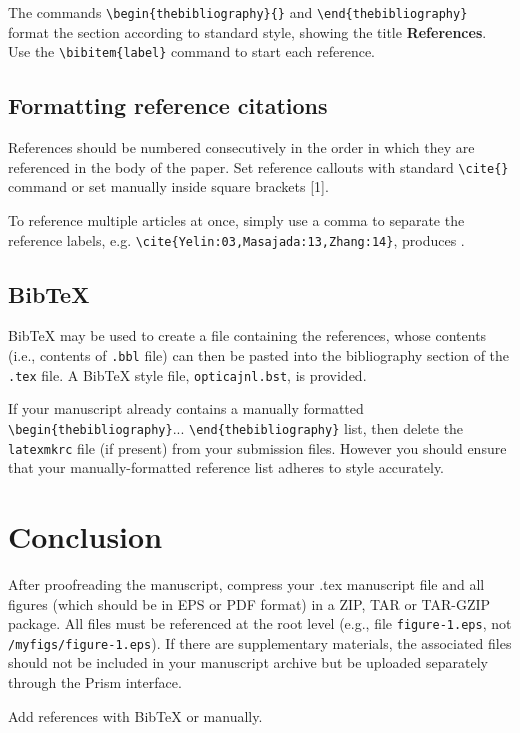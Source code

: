 \documentclass{../packages/optica-article}
\begin{document}
The commands \verb+\begin{thebibliography}{}+ and \verb+\end{thebibliography}+ format the section according to standard style, showing the title {\bfseries References}.  Use the \verb+\bibitem{label}+ command to start each reference.

\subsection{Formatting reference citations}
References should be numbered consecutively in the order in which they are referenced in the body of the paper. Set reference callouts with standard \verb+\cite{}+ command or set manually inside square brackets [1].

To reference multiple articles at once, simply use a comma to separate the reference labels, e.g. \verb+\cite{Yelin:03,Masajada:13,Zhang:14}+, produces \cite{Yelin:03,Masajada:13,Zhang:14}.

\subsection{Bib\TeX}
\label{sec:bibtex}
Bib\TeX{} may be used to create a file containing the references, whose contents (i.e., contents of \texttt{.bbl} file) can then be pasted into the bibliography section of the \texttt{.tex} file. A Bib\TeX{} style file, \texttt{opticajnl.bst}, is provided.

If your manuscript already contains a manually formatted \verb|\begin{thebibliography}|... \verb|\end{thebibliography}| list, then delete the \texttt{latexmkrc} file (if present) from your submission files. However you should ensure that your manually-formatted reference list adheres to style accurately.

\section{Conclusion}
After proofreading the manuscript, compress your .tex manuscript file and all figures (which should be in EPS or PDF format) in a ZIP, TAR or TAR-GZIP package. All files must be referenced at the root level (e.g., file \texttt{figure-1.eps}, not \texttt{/myfigs/figure-1.eps}). If there are supplementary materials, the associated files should not be included in your manuscript archive but be uploaded separately through the Prism interface.


Add references with BibTeX or manually.
\cite{Zhang:14,OPTICA,FORSTER2007,Dean2006,testthesis,Yelin:03,Masajada:13,codeexample}


\end{document}

